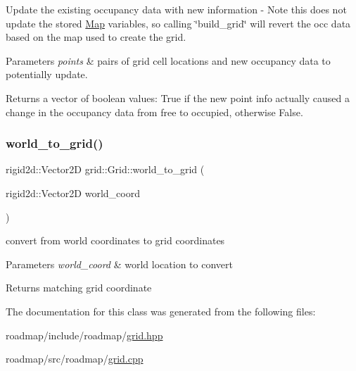 Update the existing occupancy data with new information -\/ Note this does not update the stored \hyperlink{structgrid_1_1Map}{Map} variables, so calling \char`\"{}build\+\_\+grid\char`\"{} will revert the occ data based on the map used to create the grid. 


\begin{DoxyParams}{Parameters}
{\em points} & pairs of grid cell locations and new occupancy data to potentially update. \\
\hline
\end{DoxyParams}
\begin{DoxyReturn}{Returns}
a vector of boolean values\+: True if the new point info actually caused a change in the occupancy data from free to occupied, otherwise False. 
\end{DoxyReturn}
\mbox{\label{classgrid_1_1Grid_a9aeb33485b294ab4a07178359db6e3cf}} 
\subsubsection{\texorpdfstring{world\+\_\+to\+\_\+grid()}{world\_to\_grid()}}
{\footnotesize\ttfamily rigid2d\+::\+Vector2D grid\+::\+Grid\+::world\+\_\+to\+\_\+grid (\begin{DoxyParamCaption}\item[{rigid2d\+::\+Vector2D}]{world\+\_\+coord }\end{DoxyParamCaption})}



convert from world coordinates to grid coordinates 


\begin{DoxyParams}{Parameters}
{\em world\+\_\+coord} & world location to convert \\
\hline
\end{DoxyParams}
\begin{DoxyReturn}{Returns}
matching grid coordinate 
\end{DoxyReturn}


The documentation for this class was generated from the following files\+:\begin{DoxyCompactItemize}
\item 
roadmap/include/roadmap/\hyperlink{grid_8hpp}{grid.\+hpp}\item 
roadmap/src/roadmap/\hyperlink{grid_8cpp}{grid.\+cpp}\end{DoxyCompactItemize}
